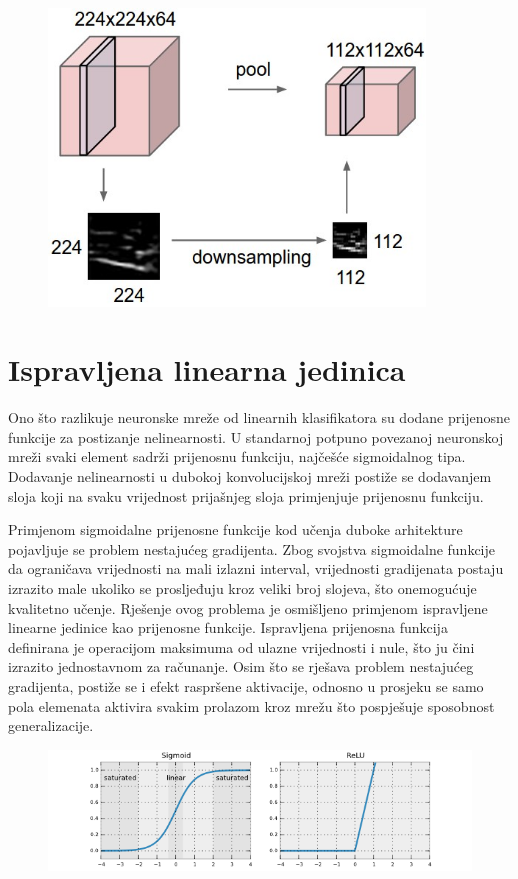 \documentclass[lmodern, utf8, diplomski, numeric]{fer}
\begin{document}
\begin{figure}[ht!]
\centering
\includegraphics[width=10cm]{slike/max_pooling.jpeg}
\caption{}
\end{figure}


\section{Ispravljena linearna jedinica}

Ono što razlikuje neuronske mreže od linearnih klasifikatora su dodane prijenosne funkcije za postizanje nelinearnosti. U standarnoj potpuno povezanoj neuronskoj mreži svaki element sadrži prijenosnu funkciju, najčešće sigmoidalnog tipa. Dodavanje nelinearnosti u dubokoj konvolucijskoj mreži postiže se dodavanjem sloja koji na svaku vrijednost prijašnjeg sloja primjenjuje prijenosnu funkciju. 

Primjenom sigmoidalne prijenosne funkcije kod učenja duboke arhitekture pojavljuje se problem nestajućeg gradijenta. Zbog svojstva sigmoidalne funkcije da ograničava vrijednosti na mali izlazni interval, vrijednosti gradijenata postaju izrazito male ukoliko se prosljeđuju kroz veliki broj slojeva, što onemogućuje kvalitetno učenje.
Rješenje ovog problema je osmišljeno primjenom ispravljene linearne jedinice kao prijenosne funkcije. Ispravljena prijenosna funkcija definirana je operacijom maksimuma od ulazne vrijednosti i nule, što ju čini izrazito jednostavnom za računanje. Osim što se rješava problem nestajućeg gradijenta, postiže se i efekt raspršene aktivacije, odnosno u prosjeku se samo pola elemenata aktivira svakim prolazom kroz mrežu što pospješuje sposobnost generalizacije.  

\begin{figure}[ht!]
\centering
\includegraphics[width=15cm]{slike/sigmoid_relu.png}
\caption{}
\end{figure}
\end{document}
